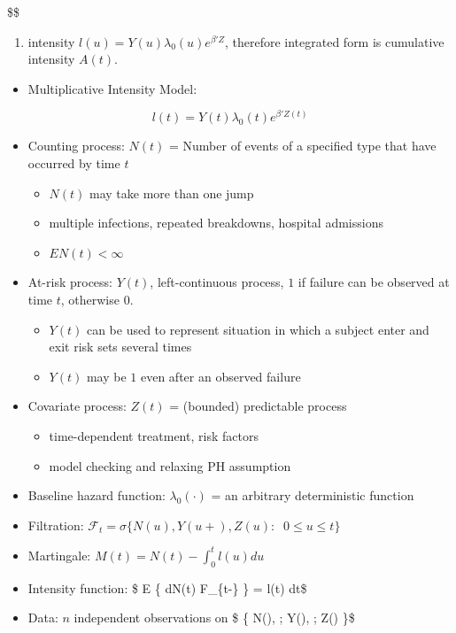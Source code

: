 \documentclass[
]{book}
\providecommand{\tightlist}{%
  \setlength{\itemsep}{0pt}\setlength{\parskip}{0pt}}
\theoremstyle{definition}
\theoremstyle{definition}
\theoremstyle{definition}
\theoremstyle{definition}
\theoremstyle{remark}
\begin{document}
\$\$

\begin{enumerate}
\def\labelenumi{\arabic{enumi})}
\tightlist
\item
  intensity \(l(u) = Y(u)\lambda_0(u) e^{\beta ' Z }\), therefore integrated form is cumulative intensity \(A(t)\).
\end{enumerate}

\begin{itemize}
\tightlist
\item
  Multiplicative Intensity Model:
\end{itemize}

\[
l(t) = Y(t)\lambda_0(t) e^{\beta ' Z(t) }
\]

\begin{itemize}
\item
  Counting process: \(N(t)\) = Number of events of a specified type that have occurred by time \(t\)

  \begin{itemize}
  \tightlist
  \item
    \(N(t)\) may take more than one jump
  \item
    multiple infections, repeated breakdowns, hospital admissions
  \item
    \(EN(t) < \infty\)
  \end{itemize}
\item
  At-risk process: \(Y(t)\), left-continuous process, \(1\) if failure can be observed at time \(t\), otherwise \(0\).

  \begin{itemize}
  \tightlist
  \item
    \(Y(t)\) can be used to represent situation in which a subject enter and exit risk sets several times
  \item
    \(Y(t)\) may be \(1\) even after an observed failure
  \end{itemize}
\item
  Covariate process: \(Z(t)\) = (bounded) predictable process

  \begin{itemize}
  \tightlist
  \item
    time-dependent treatment, risk factors
  \item
    model checking and relaxing PH assumption
  \end{itemize}
\item
  Baseline hazard function: \(\lambda_0(\cdot)\) = an arbitrary deterministic function
\item
  Filtration: \(\mathcal F_t = \sigma \Big \{ N(u) , Y(u+) , Z(u): \; \; 0 \le u \le t \Big \}\)
\item
  Martingale: \(M(t) = N(t) - \int_0^t l(u) du\)
\item
  Intensity function: \$ E \Big \{ dN(t) \Big \textbar{} \mathcal F\_\{t-\} \Big\} = l(t) dt\$
\item
  Data: \(n\) independent observations on \$ \Big \{ N(\cdot), ; Y(\cdot), ; Z(\cdot) \Big \}\$
\end{itemize}
\end{document}
